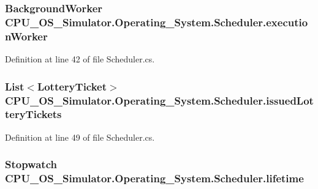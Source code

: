 \subsubsection[{execution\+Worker}]{\setlength{\rightskip}{0pt plus 5cm}Background\+Worker C\+P\+U\+\_\+\+O\+S\+\_\+\+Simulator.\+Operating\+\_\+\+System.\+Scheduler.\+execution\+Worker\hspace{0.3cm}{\ttfamily [private]}}\label{class_c_p_u___o_s___simulator_1_1_operating___system_1_1_scheduler_a8b68cea278d24fcc12c6721210fe8dcb}


Definition at line 42 of file Scheduler.\+cs.

\hypertarget{class_c_p_u___o_s___simulator_1_1_operating___system_1_1_scheduler_a2cc17fd33517614da823a344f54cdd7c}{}
\subsubsection[{issued\+Lottery\+Tickets}]{\setlength{\rightskip}{0pt plus 5cm}List$<${\bf Lottery\+Ticket}$>$ C\+P\+U\+\_\+\+O\+S\+\_\+\+Simulator.\+Operating\+\_\+\+System.\+Scheduler.\+issued\+Lottery\+Tickets\hspace{0.3cm}{\ttfamily [private]}}\label{class_c_p_u___o_s___simulator_1_1_operating___system_1_1_scheduler_a2cc17fd33517614da823a344f54cdd7c}


Definition at line 49 of file Scheduler.\+cs.

\hypertarget{class_c_p_u___o_s___simulator_1_1_operating___system_1_1_scheduler_a765eabf93b7584d7d1476d18f283a85e}{}
\subsubsection[{lifetime}]{\setlength{\rightskip}{0pt plus 5cm}Stopwatch C\+P\+U\+\_\+\+O\+S\+\_\+\+Simulator.\+Operating\+\_\+\+System.\+Scheduler.\+lifetime\hspace{0.3cm}{\ttfamily [private]}}\label{class_c_p_u___o_s___simulator_1_1_operating___system_1_1_scheduler_a765eabf93b7584d7d1476d18f283a85e}


